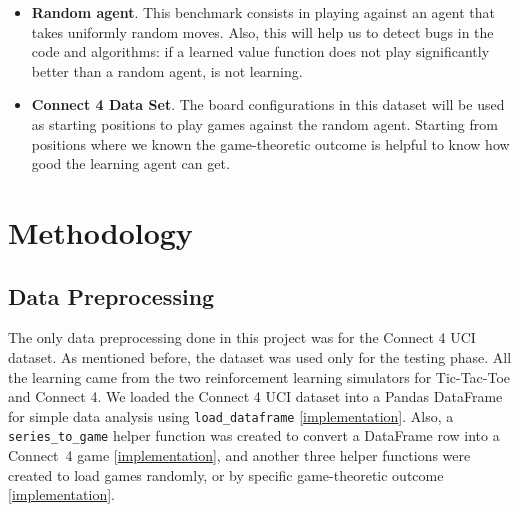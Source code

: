 \documentclass{article}
\newcommand{\GithubURL}[1]{[\href{https://github.com/davidrobles/mlnd-capstone-code/blob/master/#1}{implementation}]}
\begin{document}
\begin{itemize}

    \item \textbf{Random agent}. This benchmark consists in playing against an agent that takes
        uniformly random moves. Also, this will help us to detect bugs in the code and algorithms:
        if a learned value function does not play significantly better than a random agent, is not
        learning.

    \item \textbf{Connect 4 Data Set}. The board configurations in this dataset will be used as
        starting positions to play games against the random agent. Starting from positions where we
        known the game-theoretic outcome is helpful to know how good the learning agent can get.

\end{itemize}


\section{Methodology}

\subsection{Data Preprocessing}

The only data preprocessing done in this project was for the Connect 4 UCI dataset. As mentioned
before, the dataset was used only for the testing phase. All the learning came from the two
reinforcement learning simulators for Tic-Tac-Toe and Connect 4. We loaded the Connect 4 UCI dataset
into a Pandas DataFrame for simple data analysis using \texttt{load\_dataframe}
\GithubURL{capstone/datasets/ucic4.py\#L6}. Also, a \texttt{series\_to\_game} helper function was
created to convert a DataFrame row into a \mbox{Connect 4} game
\GithubURL{capstone/datasets/ucic4.py\#L24}, and another three helper functions were created to load
games randomly, or by specific game-theoretic outcome \GithubURL{capstone/datasets/ucic4.py\#L49}.

\end{document}
